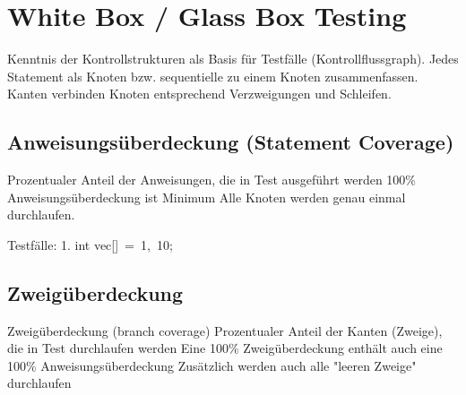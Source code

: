 	
\section{White Box / Glass Box Testing}

Kenntnis der Kontrollstrukturen als Basis für Testfälle (Kontrollflussgraph). Jedes Statement als Knoten bzw. sequentielle zu einem Knoten zusammenfassen. Kanten verbinden Knoten entsprechend Verzweigungen und Schleifen.


\subsection{Anweisungsüberdeckung (Statement Coverage)}
Prozentualer Anteil der Anweisungen, die in 
Test ausgeführt werden 100\% Anweisungsüberdeckung ist Minimum
Alle Knoten werden genau einmal durchlaufen.

Testfälle:
1. int vec[] = {1, 10};

\subsection{Zweigüberdeckung}
 Zweigüberdeckung (branch coverage)
Prozentualer Anteil der Kanten (Zweige), die 
in Test durchlaufen werden
Eine 100\% Zweigüberdeckung enthält auch 
eine 100\% Anweisungsüberdeckung
Zusätzlich werden auch alle "leeren Zweige" 
durchlaufen

